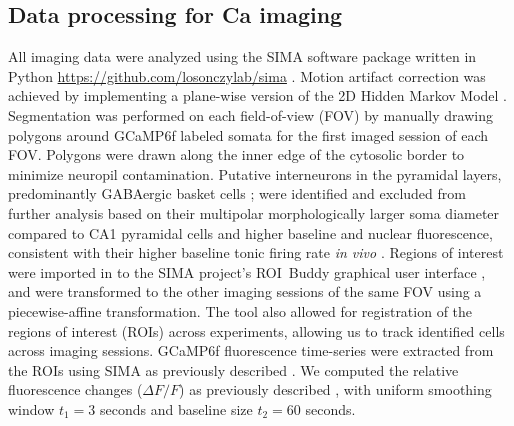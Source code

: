 \subsection{Data processing for Ca imaging}\label{sec:df:methods:processing}
All imaging data were analyzed using the SIMA software package written in Python \url{https://github.com/losonczylab/sima} \citep{Kaifosh2014}. Motion artifact correction was achieved by implementing a plane-wise version of the 2D Hidden Markov Model \citep{Dombeck2010, Kaifosh2013, Kaifosh2014}. Segmentation was performed on each field-of-view (FOV) by manually drawing polygons around GCaMP6f labeled somata for the first imaged session of each FOV. Polygons were drawn along the inner edge of the cytosolic border to minimize neuropil contamination. Putative interneurons in the pyramidal layers, predominantly GABAergic basket cells \citep{Bezaire2013, Freund1996, Klausberger2008}; were identified and excluded from further analysis based on their multipolar morphologically larger soma diameter compared to CA1 pyramidal cells \citep{Ambros-Ingerson2005, Gulyas1999a, Papp2013} and higher baseline and nuclear fluorescence, consistent with their higher baseline tonic firing rate \emph{in vivo} \citep{Klausberger2003, Klausberger2003, Lapray2012, Varga2012}. Regions of interest were imported in to the SIMA project's ROI~Buddy graphical user interface \citep{Kaifosh2014}, and were transformed to the other imaging sessions of the same FOV using a piecewise-affine transformation. The tool also allowed for registration of the regions of interest (ROIs) across experiments, allowing us to track identified cells across imaging sessions. GCaMP6f fluorescence time-series were extracted from the ROIs using SIMA as previously described \citep{Kaifosh2014}. We computed the relative fluorescence changes ($\Delta F/F$) as previously described \citep{Jia2011}, with uniform smoothing window $t_1 = 3$ seconds and baseline size $t_2 = 60$ seconds.

